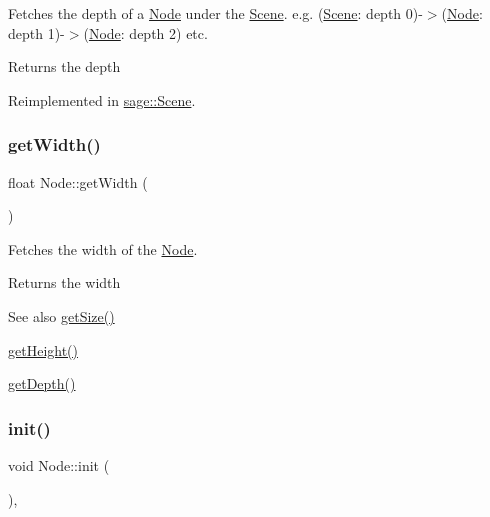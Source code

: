 Fetches the depth of a \mbox{\hyperlink{classsage_1_1Node}{Node}} under the \mbox{\hyperlink{classsage_1_1Scene}{Scene}}. e.\+g. (\mbox{\hyperlink{classsage_1_1Scene}{Scene}}\+: depth 0)-\/$>$(\mbox{\hyperlink{classsage_1_1Node}{Node}}\+: depth 1)-\/$>$(\mbox{\hyperlink{classsage_1_1Node}{Node}}\+: depth 2) etc. 

\begin{DoxyReturn}{Returns}
the depth 
\end{DoxyReturn}


Reimplemented in \mbox{\hyperlink{classsage_1_1Scene_ae1a853d0cba5d20d1f25b05c9a3f89d1}{sage\+::\+Scene}}.

\mbox{\label{classsage_1_1Node_a65163ffabcfe9f482282ea37ead6fc5f}} 
\subsubsection{\texorpdfstring{getWidth()}{getWidth()}}
{\footnotesize\ttfamily float Node\+::get\+Width (\begin{DoxyParamCaption}{ }\end{DoxyParamCaption})}



Fetches the width of the \mbox{\hyperlink{classsage_1_1Node}{Node}}. 

\begin{DoxyReturn}{Returns}
the width 
\end{DoxyReturn}
\begin{DoxySeeAlso}{See also}
\mbox{\hyperlink{classsage_1_1Node_ad14a04d08b5261c27d3080f6a5e12836}{get\+Size()}} 

\mbox{\hyperlink{classsage_1_1Node_a6af5a8378ac8d2c3490adbc2a03f1247}{get\+Height()}} 

\mbox{\hyperlink{classsage_1_1Node_a5c4c28939c7adf7e4a65dbb02c0cbcd3}{get\+Depth()}} 
\end{DoxySeeAlso}
\mbox{\label{classsage_1_1Node_ab87776adae83149e235e37ed469f4e10}} 
\subsubsection{\texorpdfstring{init()}{init()}}
{\footnotesize\ttfamily void Node\+::init (\begin{DoxyParamCaption}{ }\end{DoxyParamCaption})\hspace{0.3cm}{\ttfamily [protected]}, {\ttfamily [virtual]}}



